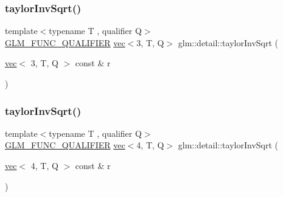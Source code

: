 \mbox{\label{namespaceglm_1_1detail_a5de2dc069a7f92df3b0bfdd27b70e1c3}} 
\subsubsection{\texorpdfstring{taylor\+Inv\+Sqrt()}{taylorInvSqrt()}\hspace{0.1cm}{\footnotesize\ttfamily [3/4]}}
{\footnotesize\ttfamily template$<$typename T , qualifier Q$>$ \\
\hyperlink{setup_8hpp_a33fdea6f91c5f834105f7415e2a64407}{G\+L\+M\+\_\+\+F\+U\+N\+C\+\_\+\+Q\+U\+A\+L\+I\+F\+I\+ER} \hyperlink{structglm_1_1vec}{vec}$<$3, T, Q$>$ glm\+::detail\+::taylor\+Inv\+Sqrt (\begin{DoxyParamCaption}\item[{\hyperlink{structglm_1_1vec}{vec}$<$ 3, T, Q $>$ const \&}]{r }\end{DoxyParamCaption})}

\mbox{\label{namespaceglm_1_1detail_a9547b07e16ac5f72eda78b5bf000fe14}} 
\subsubsection{\texorpdfstring{taylor\+Inv\+Sqrt()}{taylorInvSqrt()}\hspace{0.1cm}{\footnotesize\ttfamily [4/4]}}
{\footnotesize\ttfamily template$<$typename T , qualifier Q$>$ \\
\hyperlink{setup_8hpp_a33fdea6f91c5f834105f7415e2a64407}{G\+L\+M\+\_\+\+F\+U\+N\+C\+\_\+\+Q\+U\+A\+L\+I\+F\+I\+ER} \hyperlink{structglm_1_1vec}{vec}$<$4, T, Q$>$ glm\+::detail\+::taylor\+Inv\+Sqrt (\begin{DoxyParamCaption}\item[{\hyperlink{structglm_1_1vec}{vec}$<$ 4, T, Q $>$ const \&}]{r }\end{DoxyParamCaption})}

\mbox{\label{namespaceglm_1_1detail_ac16321696a34b41c55f941b319d50652}} 
